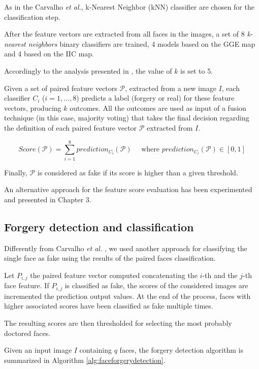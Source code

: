 As in the Carvalho \emph{et al.}\cite{carvalho2016illuminant}, k-Nearest Neighbor (kNN) classifier\cite{bishop2007pattern} are chosen for the classification step.

After the feature vectors are extracted from all faces in the images, a set of 8 \emph{k-nearest neighbors} binary classifiers are trained, 4 models based on the GGE map and 4 based on the IIC map. 

Accordingly to the analysis presented in \cite{carvalho2016illuminant}, the value of $k$ is set to 5.

Given a set of paired feature vectors $\mathcal{P}$, extracted from a new image $I$, each classifier $C_i$ ($i = 1, \ldots, 8$) predicts a label (forgery or real) for these feature vectors, producing $k$ outcomes. All the outcomes are used as input of a fusion technique (in this case, majority voting) that takes the final decision regarding the definition of each paired feature vector $\mathcal{P}$ extracted from $I$.

$$
Score(\mathcal{P}) = \sum_{i = 1}^{8} prediction_{C_i}(\mathcal{P}) \quad \textrm{ where } prediction_{C_i}(\mathcal{P}) \in [0, 1]
$$

Finally, $\mathcal{P}$ is considered as fake if its score is higher than a given threshold. 

An alternative approach for the feature score evaluation has been experimented and presented in Chapter 3.

\subsection{Forgery detection and classification}

Differently from Carvalho \emph{et al.} \cite{carvalho2016illuminant}, we used another approach for classifying the single face as fake using the results of the paired faces classification. 

Let $P_{i, j}$ the paired feature vector computed concatenating the $i$-th and the $j$-th face feature. If $P_{i, j}$ is classified as fake, the scores of the considered images are incremented the prediction output values. At the end of the process, faces with higher associated scores have been classified as fake multiple times.

The resulting scores are then thresholded for selecting the most probably doctored faces. 

Given an input image $I$ containing $q$ faces, the forgery detection algorithm is summarized in Algorithm \ref{alg:faceforgerydetection}.

